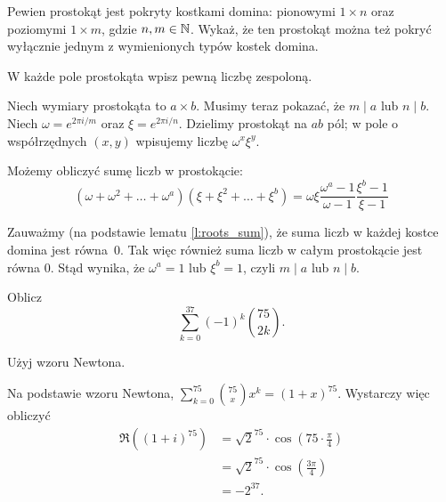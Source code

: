 \documentclass{scrartcl}
\begin{document}
    \begin{problem}
        Pewien prostokąt jest pokryty kostkami domina: pionowymi $1 \times n$ oraz poziomymi $1 \times m$, gdzie $n, m \in \mathbb N$. Wykaż, że ten prostokąt można też pokryć wyłącznie jednym z wymienionych typów kostek domina.
        \begin{hint}
            W każde pole prostokąta wpisz pewną liczbę zespoloną.
        \end{hint}
        \begin{answer}
            Niech wymiary prostokąta to $a \times b$. Musimy teraz pokazać, że $m \mid a$ lub $n \mid b$. Niech $\omega = e^{2\pi i/m}$ oraz $\xi = e^{2\pi i/n}$. Dzielimy prostokąt na $ab$ pól; w pole o współrzędnych $(x, y)$ wpisujemy liczbę $\omega^x\xi^y$.

            Możemy obliczyć sumę liczb w prostokącie:
            $$ (\omega + \omega^2 + \ldots + \omega^a)(\xi + \xi^2 + \ldots + \xi^b) = \omega\xi\frac{\omega^a - 1}{\omega - 1}\frac{\xi^b - 1}{\xi - 1} $$

            Zauważmy (na podstawie lematu \ref{l:roots_sum}), że suma liczb w każdej kostce domina jest równa~$0$. Tak więc również suma liczb w całym prostokącie jest równa $0$. Stąd wynika, że $\omega^a = 1$ lub $\xi^b = 1$, czyli $m \mid a$ lub $n \mid b$.
        \end{answer}
    \end{problem}

    \begin{problem}
        Oblicz
        $$ \sum_{k = 0}^{37} (-1)^k\binom{75}{2k}. $$
        \begin{hint}
            Użyj wzoru Newtona.
        \end{hint}
        \begin{answer}
            Na podstawie wzoru Newtona, $\sum_{k = 0}^{75}\binom{75}{x}x^k = (1 + x)^{75}$. Wystarczy więc obliczyć
            \begin{align*}
                \Re\left((1 + i)^{75}\right) &= \sqrt{2}^{75} \cdot \cos\left(75\cdot\frac{\pi}{4}\right) \\
                                              &= \sqrt{2}^{75} \cdot \cos\left(\frac{3\pi}{4}\right) \\
                                              &= -2^{37}.
            \end{align*}
        \end{answer}
    \end{problem}
\end{document}
